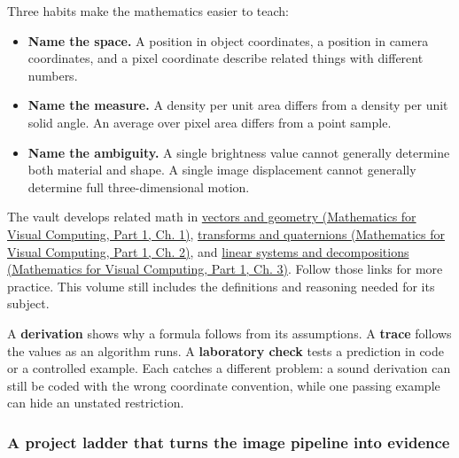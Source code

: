 Three habits make the mathematics easier to teach:

\begin{itemize}
\tightlist
\item
  \textbf{Name the space.} A position in object coordinates, a position in camera coordinates, and a pixel coordinate describe related things with different numbers.
\item
  \textbf{Name the measure.} A density per unit area differs from a density per unit solid angle. An average over pixel area differs from a point sample.
\item
  \textbf{Name the ambiguity.} A single brightness value cannot generally determine both material and shape. A single image displacement cannot generally determine full three-dimensional motion.
\end{itemize}

The vault develops related math in \href{../02-Mathematics-for-Visual-Computing-P01/main.pdf\#01-foundations-i-ch017-the-panel-gives-us-a-reason-to-learn}{vectors and geometry (Mathematics for Visual Computing, Part 1, Ch. 1)}, \href{../02-Mathematics-for-Visual-Computing-P01/main.pdf\#01-foundations-i-ch018-keep-the-promises-visible-while-moving-between-representations}{transforms and quaternions (Mathematics for Visual Computing, Part 1, Ch. 2)}, and \href{../02-Mathematics-for-Visual-Computing-P01/main.pdf\#01-foundations-i-ch019-the-graphics-problem-hiding-inside-a-matrix-equation}{linear systems and decompositions (Mathematics for Visual Computing, Part 1, Ch. 3)}. Follow those links for more practice. This volume still includes the definitions and reasoning needed for its subject.

A \textbf{derivation} shows why a formula follows from its assumptions. A \textbf{trace} follows the values as an algorithm runs. A \textbf{laboratory check} tests a prediction in code or a controlled example. Each catches a different problem: a sound derivation can still be coded with the wrong coordinate convention, while one passing example can hide an unstated restriction.

\subsubsection{A project ladder that turns the image pipeline into evidence}\label{03-visual-computing-i-ch001-a-project-ladder-that-turns-the-image-pipeline-into-evidence}

\hypertarget{03-visual-computing-i-ch001-a-project-ladder-that-turns-the-image-pipeline-into-evidence}{}

